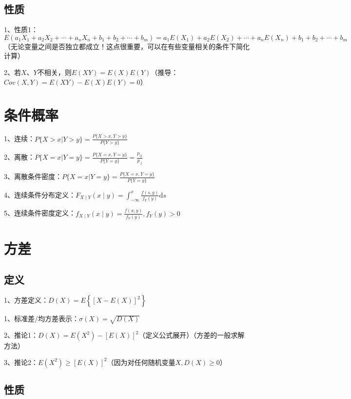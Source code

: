 \subsection{性质}

1、性质1：$E(a_1X_1+a_2X_2+\cdots+a_nX_n+b_1+b_2+\cdots+b_m)=a_1E(X_1)+a_2E(X_2)+\cdots+a_nE(X_n)+b_1+b_2+\cdots+b_m$（无论变量之间是否独立都成立！这点很重要，可以在有些变量相关的条件下简化计算）

2、若$X$、$Y$不相关，则$E ( X Y ) = E ( X ) E ( Y )$（推导：$C o v ( X , Y ) = E ( X Y ) - E ( X ) E ( Y ) =0$）

\section{条件概率}

1、连续：$P\{X>x|Y>y\} = \frac {P\{X>x,Y>y\}}{P\{Y>y\}}$

2、离散：$P\{X=x|Y=y\} = \frac {P\{X=x,Y=y\}}{P\{Y=y\}} = \frac {p_{ij}}{p_{\cdot j}}$

3、离散条件密度：$P\{X=x|Y=y\} = \frac {P\{X=x,Y=y\}}{P\{Y=y\}}$

4、连续条件分布定义：$F_{X \mid Y}(x \mid y)=\int_{-\infty}^{x} \frac{f(s, y)}{f_{Y}(y)} \mathrm{d} s$

5、连续条件密度定义：$f_{X \mid Y}(x \mid y)=\frac{f(x, y)}{f_{Y}(y)}, f_{Y}(y)>0$

\section{方差}



\subsection{定义}

1、方差定义：$D(X)=E\left\{[X-E(X)]^{2}\right\}$

1、标准差/均方差表示：$\sigma(X)=\sqrt{D(X)}$

2、推论1：$D(X)=E\left(X^{2}\right)-[E(X)]^{2}$（定义公式展开）（方差的一般求解方法）

3、推论2：$E\left(X^{2}\right) \geqslant[E(X)]^{2}$（因为对任何随机变量$X, D(X) \geqslant 0$）



\subsection{性质}

